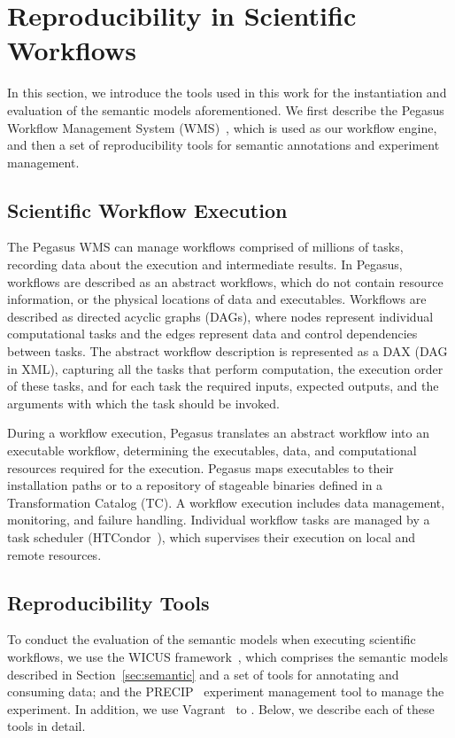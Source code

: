 \section{Reproducibility in Scientific Workflows}
\label{sec:reproducibility}

In this section, we introduce the tools used in this work for the instantiation and evaluation 
of the semantic models aforementioned. We first describe the Pegasus Workflow 
Management System (WMS)~\cite{Pegasus, Deelman-FGCS-2014}, which is used as our 
workflow engine, and then a set of reproducibility tools for semantic annotations and 
experiment management.


\subsection{Scientific Workflow Execution}

The Pegasus WMS can manage workflows comprised of millions of tasks, recording data 
about the execution and intermediate results. In Pegasus, workflows are described as an 
abstract workflows, which do not contain resource information, or the physical locations of 
data and executables. Workflows are described as directed acyclic graphs (DAGs), where 
nodes represent individual computational tasks and the edges represent data and control 
dependencies between tasks. The abstract workflow description is represented as a DAX 
(DAG in XML), capturing all the tasks that perform computation, the execution order of these 
tasks, and for each task the required inputs, expected outputs, and the arguments with which 
the task should be invoked. 

During a workflow execution, Pegasus translates an abstract workflow into an 
executable workflow, determining the executables, data, and computational resources 
required for the execution. Pegasus maps executables to their installation paths or to a 
repository of stageable binaries defined in a Transformation Catalog (TC). A workflow 
execution includes data management, monitoring, and failure handling. Individual workflow 
tasks are managed by a task scheduler (HTCondor~\cite{condor}), which supervises their 
execution on local and remote resources.


\subsection{Reproducibility Tools}

To conduct the evaluation of the semantic models when executing scientific workflows, we 
use the WICUS framework~\cite{wicus}, which comprises the semantic models described 
in Section~\ref{sec:semantic} and a set of tools for annotating and consuming data; and 
the PRECIP~\cite{Azarnoosh-CRC-2013} experiment management tool to manage the 
experiment. In addition, we use Vagrant~\cite{palat2012introducing} to . 
Below, we describe each of these tools in detail.


